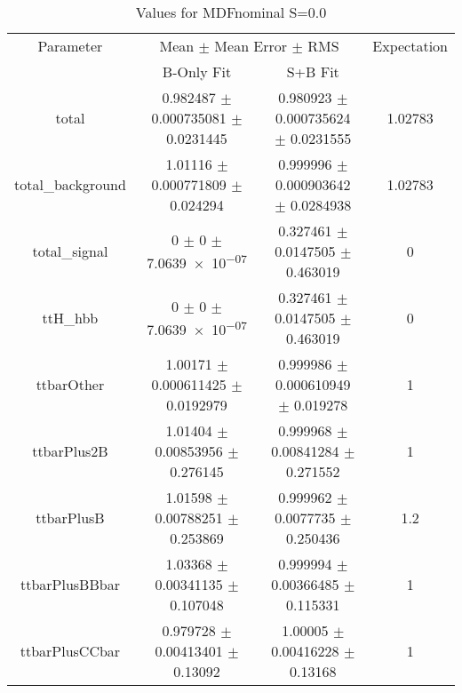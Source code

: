 \begin{table}
\centering
\caption{Values for MDFnominal S=0.0}
\begin{tabular}{cccc}
\toprule
Parameter & \multicolumn{2}{c}{Mean $\pm$ Mean Error $\pm$ RMS} & Expectation\\
 & B-Only Fit & S+B Fit & \\
\midrule
total & \num{0.982487} $\pm$ \num{0.000735081} $\pm$ \num{0.0231445} & \num{0.980923} $\pm$ \num{0.000735624} $\pm$ \num{0.0231555} & \num{1.02783}\\
total\_background & \num{1.01116} $\pm$ \num{0.000771809} $\pm$ \num{0.024294} & \num{0.999996} $\pm$ \num{0.000903642} $\pm$ \num{0.0284938} & \num{1.02783}\\
total\_signal & \num{0} $\pm$ \num{0} $\pm$ \num{7.0639e-07} & \num{0.327461} $\pm$ \num{0.0147505} $\pm$ \num{0.463019} & \num{0}\\
ttH\_hbb & \num{0} $\pm$ \num{0} $\pm$ \num{7.0639e-07} & \num{0.327461} $\pm$ \num{0.0147505} $\pm$ \num{0.463019} & \num{0}\\
ttbarOther & \num{1.00171} $\pm$ \num{0.000611425} $\pm$ \num{0.0192979} & \num{0.999986} $\pm$ \num{0.000610949} $\pm$ \num{0.019278} & \num{1}\\
ttbarPlus2B & \num{1.01404} $\pm$ \num{0.00853956} $\pm$ \num{0.276145} & \num{0.999968} $\pm$ \num{0.00841284} $\pm$ \num{0.271552} & \num{1}\\
ttbarPlusB & \num{1.01598} $\pm$ \num{0.00788251} $\pm$ \num{0.253869} & \num{0.999962} $\pm$ \num{0.0077735} $\pm$ \num{0.250436} & \num{1.2}\\
ttbarPlusBBbar & \num{1.03368} $\pm$ \num{0.00341135} $\pm$ \num{0.107048} & \num{0.999994} $\pm$ \num{0.00366485} $\pm$ \num{0.115331} & \num{1}\\
ttbarPlusCCbar & \num{0.979728} $\pm$ \num{0.00413401} $\pm$ \num{0.13092} & \num{1.00005} $\pm$ \num{0.00416228} $\pm$ \num{0.13168} & \num{1}\\
\bottomrule
\end{tabular}
\end{table}